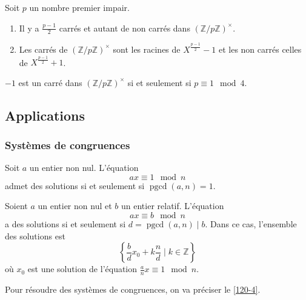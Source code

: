 	Soit $p$ un nombre premier impair.
	
	\begin{theorem}
		\begin{enumerate}[label=(\roman*)]
			\item Il y a $\frac{p-1}{2}$ carrés et autant de non carrés dans $(\mathbb{Z}/p\mathbb{Z})^\times$.
			\item Les carrés de $(\mathbb{Z}/p\mathbb{Z})^\times$ sont les racines de $X^{\frac{p-1}{2}} - 1$ et les non carrés celles de $X^{\frac{p-1}{2}} + 1$.
		\end{enumerate}
	\end{theorem}
	
	\begin{corollary}
		$-1$ est un carré dans $(\mathbb{Z}/p\mathbb{Z})^\times$ si et seulement si $p \equiv 1 \mod 4$.
	\end{corollary}
	
	\subsection{Applications}
	
	\subsubsection{Systèmes de congruences}
	
	
	\begin{proposition}
		Soit $a$ un entier non nul. L'équation
		\[ ax \equiv 1 \mod n \]
		admet des solutions si et seulement si $\operatorname{pgcd}(a,n) = 1$.
	\end{proposition}
	
	\begin{corollary}
		Soient $a$ un entier non nul et $b$ un entier relatif. L'équation
		\[ ax \equiv b \mod n \]
		a des solutions si et seulement si $d = \operatorname{pgcd}(a,n) \mid b$. Dans ce cas, l'ensemble des solutions est
		\[ \left\{ \frac{b}{d}x_0 + k\frac{n}{d} \mid k \in \mathbb{Z} \right\} \]
		où $x_0$ est une solution de l'équation $\frac{a}{n}x \equiv 1 \mod n$.
	\end{corollary}
	
	
	Pour résoudre des systèmes de congruences, on va préciser le \cref{120-4}.
	

